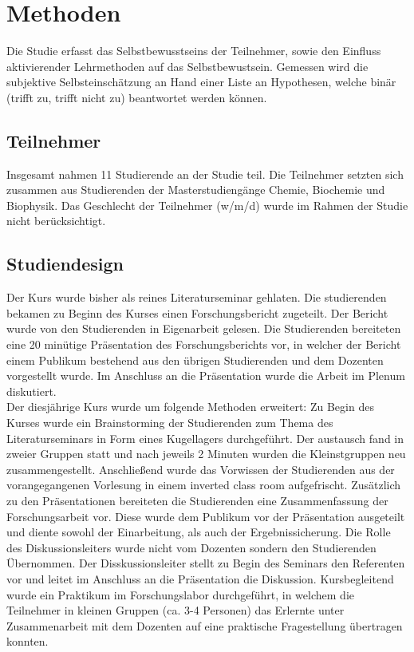 \section{Methoden}
Die Studie erfasst das Selbstbewusstseins der Teilnehmer, sowie den Einfluss aktivierender Lehrmethoden auf das Selbstbewustsein. Gemessen wird die subjektive Selbsteinschätzung an Hand einer Liste an Hypothesen, welche binär (trifft zu, trifft nicht zu) beantwortet werden können.

\subsection{Teilnehmer}
Insgesamt nahmen 11 Studierende an der Studie teil. Die Teilnehmer setzten sich zusammen aus Studierenden der Masterstudiengänge Chemie, Biochemie und Biophysik. Das Geschlecht der Teilnehmer (w/m/d) wurde im Rahmen der Studie nicht berücksichtigt.

\subsection{Studiendesign}
Der Kurs wurde bisher als reines Literaturseminar gehlaten. Die studierenden bekamen zu Beginn des Kurses einen Forschungsbericht zugeteilt. Der Bericht wurde von den Studierenden in Eigenarbeit gelesen. Die Studierenden bereiteten eine 20 minütige Präsentation des Forschungsberichts vor, in welcher der Bericht einem Publikum bestehend aus den übrigen Studierenden und dem Dozenten vorgestellt wurde. Im Anschluss an die Präsentation wurde die Arbeit im Plenum diskutiert.\\
\noindent
Der diesjährige Kurs wurde um folgende Methoden erweitert: Zu Begin des Kurses wurde ein Brainstorming der Studierenden zum Thema des Literaturseminars in Form eines Kugellagers durchgeführt. Der austausch fand in zweier Gruppen statt und nach jeweils 2 Minuten wurden die Kleinstgruppen neu zusammengestellt. Anschließend wurde das Vorwissen der Studierenden aus der vorangegangenen Vorlesung in einem inverted class room aufgefrischt. Zusätzlich zu den Präsentationen bereiteten die Studierenden eine Zusammenfassung der Forschungsarbeit vor. Diese wurde dem Publikum vor der Präsentation ausgeteilt und diente sowohl der Einarbeitung, als auch der Ergebnissicherung. Die Rolle des Diskussionsleiters wurde nicht vom Dozenten sondern den Studierenden Übernommen. Der Disskussionsleiter stellt zu Begin des Seminars den Referenten vor und leitet im Anschluss an die Präsentation die Diskussion. Kursbegleitend wurde ein Praktikum im Forschungslabor durchgeführt, in welchem die Teilnehmer in kleinen Gruppen (ca. 3-4 Personen) das Erlernte unter Zusammenarbeit mit dem Dozenten auf eine praktische Fragestellung übertragen konnten.

